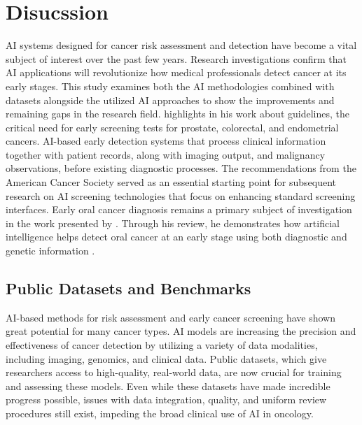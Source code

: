 \documentclass[conference]{IEEEtran}
\begin{document}
\section{Disucssion}

AI systems designed for cancer risk assessment and detection have become a vital subject of interest over the past few years. Research investigations confirm that AI applications will revolutionize how medical professionals detect cancer at its early stages. This study examines both the AI methodologies combined with datasets alongside the utilized AI approaches to show the improvements and remaining gaps in the research field. \cite{1} highlights in his work about guidelines, the critical need for early screening tests for prostate, colorectal, and endometrial cancers. AI-based early detection systems that process clinical information together with patient records, along with imaging output, and malignancy observations, before existing diagnostic processes. The recommendations from the American Cancer Society served as an essential starting point for subsequent research on AI screening technologies that focus on enhancing standard screening interfaces. Early oral cancer diagnosis remains a primary subject of investigation in the work presented by \cite{2}. Through his review, he demonstrates how artificial intelligence helps detect oral cancer at an early stage using both diagnostic and genetic information \cite{14}.


\subsection{Public Datasets and Benchmarks}

AI-based methods for risk assessment and early cancer screening have shown great potential for many cancer types. AI models are increasing the precision and effectiveness of cancer detection by utilizing a variety of data modalities, including imaging, genomics, and clinical data. Public datasets, which give researchers access to high-quality, real-world data, are now crucial for training and assessing these models. Even while these datasets have made incredible progress possible, issues with data integration, quality, and uniform review procedures still exist, impeding the broad clinical use of AI in oncology.
\end{document}
